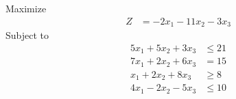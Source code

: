 \documentclass[12pt]{article}
\begin{document}
Maximize
\begin{align*}
Z                    & = -2x_{1}-11x_{2}-3x_{3}
\end{align*}
Subject to
\begin{align*}
5x_{1}+5x_{2}+3x_{3} & \le 21                                                                                                                                                                                                                                                                 \\
7x_{1}+2x_{2}+6x_{3} & = 15                                                                                                                                                                                                                                                                   \\
x_{1}+2x_{2}+8x_{3}  & \ge 8                                                                                                                                                                                                                                                                  \\
4x_{1}-2x_{2}-5x_{3} & \le 10                                                                                                                                                                                                                                                                 \\
\end{align*}
\end{document}
